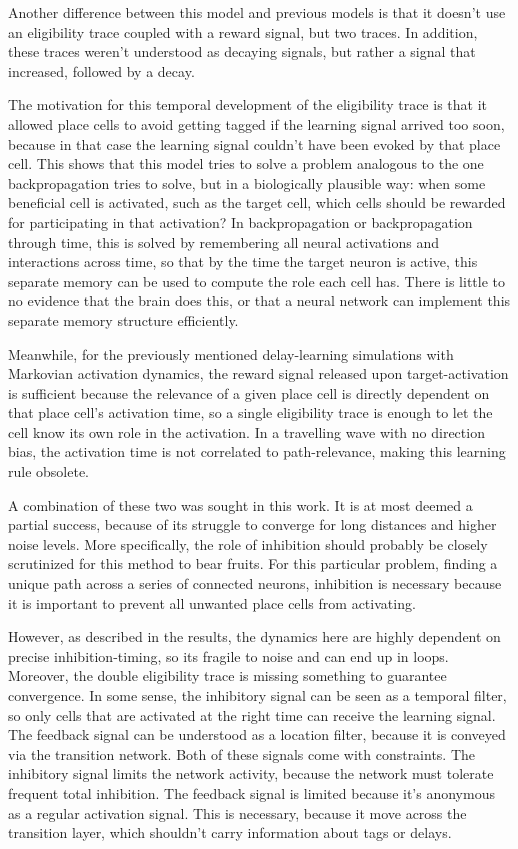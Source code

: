 \documentclass{article}
\begin{document}
    Another difference between this model and previous models is that it doesn't use an eligibility trace coupled with a reward signal, but two traces. In addition, these traces weren't understood as decaying signals, but rather a signal that increased, followed by a decay.

    The motivation for this temporal development of the eligibility trace is that it allowed place cells to avoid getting tagged if the learning signal arrived too soon, because in that case the learning signal couldn't have been evoked by that place cell. This shows that this model tries to solve a problem analogous to the one backpropagation tries to solve, but in a biologically plausible way: when some beneficial cell is activated, such as the target cell, which cells should be rewarded for participating in that activation?
    In backpropagation or backpropagation through time, this is solved by remembering all neural activations and interactions across time, so that by the time the target neuron is active, this separate memory can be used to compute the role each cell has. There is little to no evidence that the brain does this, or that a neural network can implement this separate memory structure efficiently. 

    Meanwhile, for the previously mentioned delay-learning simulations with Markovian activation dynamics, the reward signal released upon target-activation is sufficient because the relevance of a given place cell is directly dependent on that place cell's activation time, so a single eligibility trace is enough to let the cell know its own role in the activation. In a travelling wave with no direction bias, the activation time is not correlated to path-relevance, making this learning rule obsolete.

    A combination of these two was sought in this work. It is at most deemed a partial success, because of its struggle to converge for long distances and higher noise levels. More specifically, the role of inhibition should probably be closely scrutinized for this method to bear fruits. For this particular problem, finding a unique path across a series of connected neurons, inhibition is necessary because it is important to prevent all unwanted place cells from activating.

    However, as described in the results, the dynamics here are highly dependent on precise inhibition-timing, so its fragile to noise and can end up in loops. Moreover, the double eligibility trace is missing something to guarantee convergence. In some sense, the inhibitory signal can be seen as a temporal filter, so only cells that are activated at the right time can receive the learning signal. The feedback signal can be understood as a location filter, because it is conveyed via the transition network. Both of these signals come with constraints. The inhibitory signal limits the network activity, because the network must tolerate frequent total inhibition. The feedback signal is limited because it's anonymous as a regular activation signal. This is necessary, because it move across the transition layer, which shouldn't carry information about tags or delays.
\end{document}
